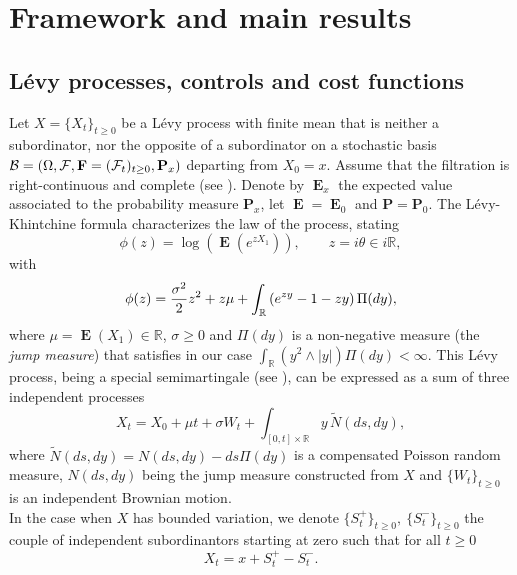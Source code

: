 \documentclass{article}
\newcommand{\R}{\mathbb{R}}%
\newcommand\E{\operatorname{\mathbf{E}}}
\begin{document}


\section{Framework and main results}\label{C43:Setting}

\subsection{L\'evy processes, controls and cost functions}\label{S:framework}
Let $X=\{X_t\}_{t\geq 0}$ be a L\'evy process with finite mean that is neither a subordinator, nor the opposite of a subordinator on a stochastic basis
${\cal B}=(\Omega, {\cal F}, {\bf F}=({\cal F}_t)_{t\geq 0}, \mathbf{P}_x)$ departing from $X_0=x$.
Assume that the filtration is right-continuous and complete (see \cite[Definition 1.3]{JJAS}).
Denote by $\E_x$ the expected value associated to the probability measure $\mathbf{P}_x$, let $\E= \E_0$ and $\mathbf{P}=\mathbf{P}_0$.   
The L\'evy-Khintchine formula characterizes the law of the process,
stating
$$
\phi (z)= \log \left( \E( e^{z X_1}) \right), \qquad z=i\theta \in i\mathbb{R},
$$
with
\begin{equation*}
\phi(z)={\sigma^2\over 2}z^2+z \mu+\int_{\R}\left(e^{z y}-1-z y\right)\Pi(dy),
\end{equation*}
where $\mu=\E(X_1)\in\R$, $\sigma\geq 0$ and $\Pi(dy)$ is a non-negative measure (the \emph{jump measure}) 
that satisfies in our case $\int_{\R}(y^2\wedge |y|)\Pi(dy)<\infty$. 
This L\'evy process, being a special semimartingale (see \cite[Chapter II, 2.29]{JJAS}), 
can be expressed as a sum of three independent processes 
\begin{equation}\label{D:LEVYPROCESSEQUATION}
X_t= X_0 +\mu t +\sigma W_t + \int_{[0,t]\times\R} y\, \tilde N(ds,dy),
\end{equation}
where $\tilde N(ds,dy)=N(ds,dy)-ds\Pi(dy)$ is a compensated Poisson random measure, 
$N(ds,dy)$ being the jump measure constructed from $X$ 
and $\lbrace W_t \rbrace_{t \geq 0}$ is an independent Brownian motion. \\
In the case when $X$ has bounded variation, we denote $\lbrace S_t^+ \rbrace_{t \geq 0}, \ \lbrace S_t^- \rbrace_{t \geq 0}$ the couple of independent subordinantors starting at zero such that for all $t \geq 0$
$$ X_t=x +S_t^+ -S_t^-.$$
\end{document}
